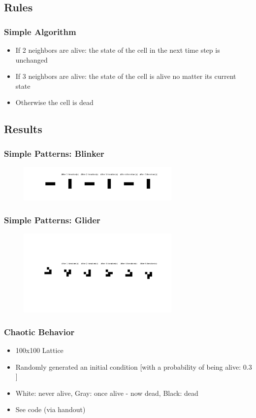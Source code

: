\documentclass{beamer}
\begin{document}
\subsection{Rules}
\frame
{
  \frametitle{Simple Algorithm}

  \begin{itemize}
  \item<1-> If 2 neighbors are alive: the state of the cell in the next time step is unchanged
  \item<2-> If 3 neighbors are alive: the state of the cell is alive no matter its current state 
  \item<3-> Otherwise the cell is dead
  \end{itemize}  
}


\subsection{Results}
\frame
{
  \frametitle{Simple Patterns: Blinker}
  \begin{figure}
   \includegraphics[width = 300]{simpleblinker}
   \end{figure}
}
\frame
{
  \frametitle{Simple Patterns: Glider}
  \begin{figure}
   \includegraphics[width = 300]{simpleglider}
   \end{figure}

}

\frame
{
  \frametitle{Chaotic Behavior}

 \begin{itemize}
  \item 100x100 Lattice
  \item Randomly generated an initial condition [with a probability of being alive: $0.3$]
  \item White: never alive, Gray: once alive - now dead, Black: dead
  \item See code (via handout)
  \end{itemize}
  
}
\end{document}
